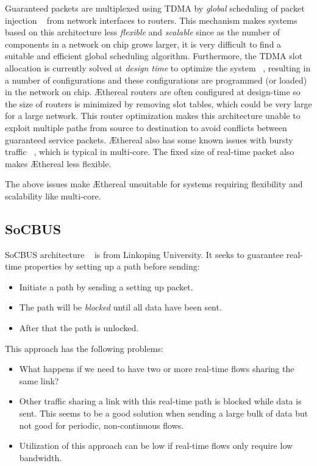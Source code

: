 \documentclass[conference, twocolumn]{IEEEtran}
\theoremstyle{definition}
\begin{document}
Guaranteed packets are multiplexed using TDMA by {\em global} scheduling of
packet injection ~\cite{Moonen07SPRINGER} from network interfaces to
routers. This mechanism makes systems based on this architecture less
{\em flexible} and {\em scalable} since as the number of components in a network
on chip grows larger, it is very difficult to find a suitable and efficient {global  scheduling} algorithm.
Furthermore, the TDMA slot allocation is currently solved at {\em design time}
to optimize the system ~\cite{Moonen07SPRINGER}, resulting in a number of
configurations and these configurations are programmed (or loaded) in the
network on chip. \AE thereal routers are often configured at design-time so
the size of routers is minimized by removing slot tables, which could be very
large for a large network. This router optimization makes this architecture unable to
exploit multiple paths from source to destination to avoid conflicts between
guaranteed service packets. \AE thereal also has some known issues with bursty
traffic ~\cite{Hansson07ISSS}, which is typical in multi-core. The fixed size
of real-time packet also makes \AE thereal less flexible.

The above issues make \AE thereal unsuitable for systems requiring
flexibility and scalability like multi-core.

\subsection{SoCBUS}
SoCBUS architecture ~\cite{SoCBUS} is from Linkoping University. It seeks to 
guarantee real-time properties by setting up a path before sending:
\begin{itemize}
\item Initiate a path by sending a setting up packet.
\item The path will be {\em blocked} until all data have been sent.
\item After that the path is unlocked.
\end{itemize}
This approach has the following problems: 
\begin{itemize}
\item What happens if we need to have two or more real-time flows sharing the
same link?
\item Other traffic sharing a link with this real-time path is blocked while 
data is sent. This seems to be a good solution when sending a large bulk of data 
but not good for periodic, non-continuous flows.
\item Utilization of this approach can be low if real-time flows only require
low bandwidth.
\end{itemize}
\end{document}

